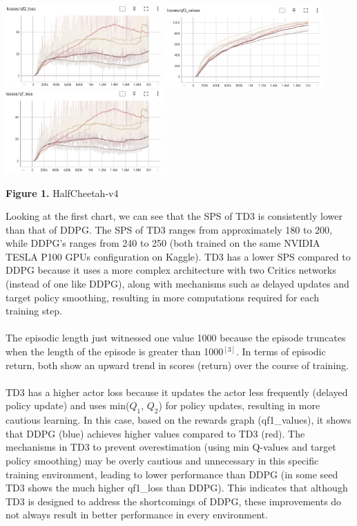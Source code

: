 \documentclass[english, a4paper,12pt]{article}
\begin{document}
\includegraphics[width=6cm]{qf2_loss_hf.png}
\includegraphics[width=6cm]{qf2_values_hf.png}
\includegraphics[width=6cm]{qf_loss_hf.png}
\begin{center}
    \textbf{Figure 1.} HalfCheetah-v4
\end{center}
\hspace*{5mm} Looking at the first chart, we can see that the SPS of TD3 is consistently lower than that of DDPG. The SPS of TD3 ranges from approximately 180 to 200, while DDPG's ranges from 240 to 250 (both trained on the same NVIDIA TESLA P100 GPUs configuration on Kaggle). TD3 has a lower SPS compared to DDPG because it uses a more complex architecture with two Critics networks (instead of one like DDPG), along with mechanisms such as delayed updates and target policy smoothing, resulting in more computations required for each training step.
\\
\vspace*{-2mm}
\\
\hspace*{5mm}The episodic length just witnessed one value 1000 because the episode truncates when the length of the episode is greater than 1000$^{[3]}$. In terms of episodic return, both show an upward trend in scores (return) over the course of training.
\\
\vspace*{-2mm}
\\
\hspace*{5mm}TD3 has a higher actor loss because it updates the actor less frequently (delayed policy update) and uses min($Q_1$, $Q_2$) for policy updates, resulting in more cautious learning. In this case, based on the rewards graph (qf1\_values), it shows that DDPG (blue) achieves higher values compared to TD3 (red). The mechanisms in TD3 to prevent overestimation (using min Q-values and target policy smoothing) may be overly cautious and unnecessary in this specific training environment, leading to lower performance than DDPG (in some seed TD3 shows the much higher qf1\_loss than DDPG). This indicates that although TD3 is designed to address the shortcomings of DDPG, these improvements do not always result in better performance in every environment.
\end{document}

